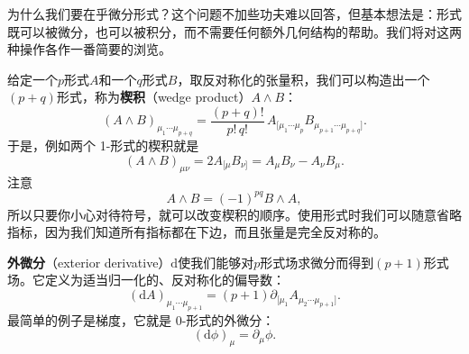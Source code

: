 为什么我们要在乎微分形式？这个问题不加些功夫难以回答，但基本想法是：形式既可以被微分，也可以被积分，而不需要任何额外几何结构的帮助。我们将对这两种操作各作一番简要的浏览。

给定一个$p$形式$A$和一个$q$形式$B$，取反对称化的张量积，我们可以构造出一个$(p+q)$形式，称为\textbf{楔积}（wedge product）$A\wedge B$：
\begin{equation*}
(A\wedge B)_{\mu_1\cdots\mu_{p+q}}=\frac{(p+q)!}{p!\,q!}\,A_{[\mu_1\cdots\mu_p}B_{\mu_{p+1}\cdots\mu_{p+q}]}.
\tag{2.73}
\end{equation*}
于是，例如两个 1-形式的楔积就是
\begin{equation*}
(A\wedge B)_{\mu\nu}=2A_{[\mu}B_{\nu]}=A_\mu B_\nu-A_\nu B_\mu.
\tag{2.74}
\end{equation*}
注意
\begin{equation*}
A\wedge B=(-1)^{pq}B\wedge A,
\tag{2.75}
\end{equation*}
所以只要你小心对待符号，就可以改变楔积的顺序。使用形式时我们可以随意省略指标，因为我们知道所有指标都在下边，而且张量是完全反对称的。

\textbf{外微分}（exterior derivative）$\mathrm{d}$使我们能够对$p$形式场求微分而得到$(p+1)$形式场。它定义为适当归一化的、反对称化的偏导数：
\begin{equation*}
(\mathrm{d}A)_{\mu_1\cdots\mu_{p+1}}=(p+1)\partial_{[\mu_1}A_{\mu_2\cdots\mu_{p+1}]}.
\tag{2.76}
\end{equation*}
最简单的例子是梯度，它就是 0-形式的外微分：
\begin{equation*}
(\mathrm{d}\phi)_\mu=\partial_\mu\phi.
\tag{2.77}
\end{equation*}
